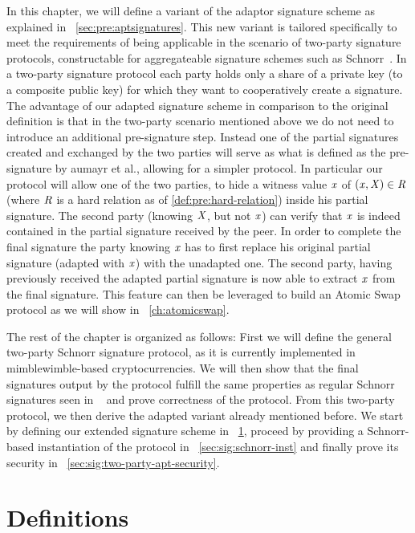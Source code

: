 In this chapter, we will define a variant of the adaptor signature scheme as explained in ~\cref{sec:pre:aptsignatures}.
This new variant is tailored specifically to meet the requirements of being applicable in the scenario of two-party signature protocols, constructable for aggregateable signature schemes such as Schnorr~\cite{maxwell2019simple}.
In a two-party signature protocol each party holds only a share of a private key (to a composite public key) for which they want to cooperatively create a signature.
The advantage of our adapted signature scheme in comparison to the original definition is that in the two-party scenario mentioned above we do not need to introduce an additional pre-signature step.
Instead one of the partial signatures created and exchanged by the two parties will serve as what is defined as the pre-signature by aumayr et al., allowing for a simpler protocol.
In particular our protocol will allow one of the two parties, to hide a witness value $\mathit{x}$ of $(\mathit{x}, \mathit{X}) \in \mathit{R}$ (where $\mathit{R}$ is a hard relation as of \cref{def:pre:hard-relation}) inside his partial signature.
The second party (knowing $\mathit{X}$, but not $\mathit{x}$) can verify that $\mathit{x}$ is indeed contained in the partial signature received by the peer.
In order to complete the final signature the party knowing $\mathit{x}$ has to first replace his original partial signature (adapted with $\mathit{x}$) with the unadapted one.
The second party, having previously received the adapted partial signature is now able to extract $\mathit{x}$ from the final signature.
This feature can then be leveraged to build an Atomic Swap protocol as we will show in ~\cref{ch:atomicswap}.

The rest of the chapter is organized as follows:
First we will define the general two-party Schnorr signature protocol, as it is currently implemented in mimblewimble-based cryptocurrencies.
We will then show that the final signatures output by the protocol fulfill the same properties as regular Schnorr signatures seen in ~\cite{schnorr1989efficient} and prove correctness of the protocol.
From this two-party protocol, we then derive the adapted variant already mentioned before.
We start by defining our extended signature scheme in ~\cref{sec:sig:definitions}, proceed by providing a Schnorr-based instantiation of the protocol in ~\cref{sec:sig:schnorr-inst} and finally prove its security in ~\cref{sec:sig:two-party-apt-security}.

\section{Definitions} \label{sec:sig:definitions}


